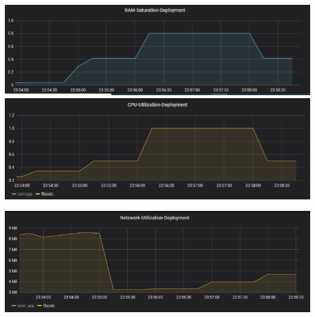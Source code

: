 \documentclass[a4paper,10pt]{scrartcl}
\begin{document}
\begin{description}
\begin{minipage}{\linewidth}
            \includegraphics[width=1\textwidth,height=.14\textheight]{img/RAMCPUSkalierung/RAMSaturation.PNG}\\
            
  			\includegraphics[width=1\textwidth]{img/RAMCPUSkalierung/CPUUtilization.PNG}\\
\end{minipage} 	

\pagebreak

\begin{minipage}{\linewidth}		
  			\includegraphics[width=1\textwidth]{img/RAMCPUSkalierung/Netzwerk.PNG}
\end{minipage}


\end{description}
\end{document}
